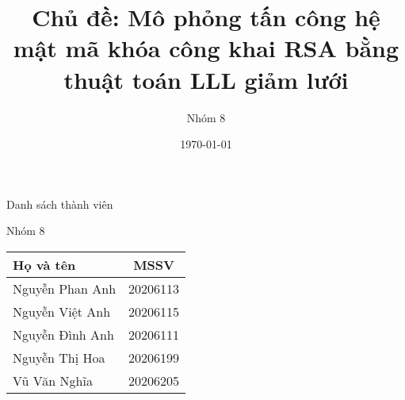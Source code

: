 \documentclass{beamer}
\title[{\makebox[.15\paperwidth]{MI4100 - Mật mã và độ phức tạp thuật toán}}]{Chủ đề: Mô phỏng tấn công hệ mật mã khóa công khai RSA bằng thuật toán LLL giảm lưới}
\author[Nhóm 8]{Nhóm 8}
\date[\today]{\today}
\begin{document}
\begin{frame}
\titlepage
\end{frame}
\begin{frame}{Danh sách thành viên}
\begin{block}{Nhóm 8}
\centering
\begin{tabular} {|l|c|}
\hline
Họ và tên & MSSV \\
\hline
Nguyễn Phan Anh & 20206113 \\
Nguyễn Việt Anh & 20206115 \\
Nguyễn Đình Anh & 20206111 \\
Nguyễn Thị Hoa & 20206199 \\
Vũ Văn Nghĩa & 20206205 \\
\hline
\end{tabular}
\end{block}
\end{frame}
\end{document}
